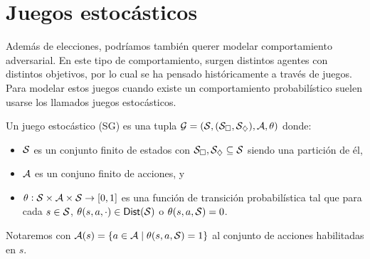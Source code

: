 





\section{Juegos estocásticos}

Además de elecciones, podríamos también querer modelar comportamiento
adversarial. En este tipo de comportamiento, surgen distintos agentes con
distintos objetivos, por lo cual se ha pensado históricamente a través de
juegos. Para modelar estos juegos cuando existe un comportamiento
probabilístico suelen usarse los llamados juegos estocásticos.

\begin{definition}
	Un juego estocástico (SG) es una tupla $\mathcal{G} = (\mathcal{S}, (\mathcal{S}_\square, \mathcal{S}_\diamondsuit), \mathcal{A}, \theta)$ donde:
	\begin{itemize}
		\item $\mathcal{S}$ es un conjunto finito de estados con $\mathcal{S}_\square, \mathcal{S}_\diamondsuit \subseteq \mathcal{S}$ siendo una partición de él,
		\item $\mathcal{A}$ es un conjuno finito de acciones, y
		\item $\theta : \mathcal{S} \times \mathcal{A} \times \mathcal{S} \rightarrow [0,1]$ es una función de transición probabilística tal que para cada $s \in \mathcal{S}$, $\theta(s, a, \cdot) \in \mathsf{Dist}(\mathcal{S})$ o  $\theta(s, a, \mathcal{S}) = 0$.
	\end{itemize}
	Notaremos con $\mathcal{A}(s) = \{a \in \mathcal{A} \mid \theta(s,a,\mathcal{S}) = 1\}$ al conjunto de acciones habilitadas en $s$.
\end{definition}

